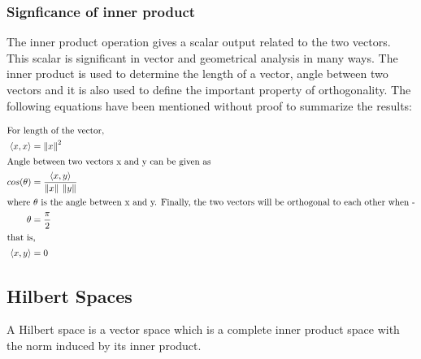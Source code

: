 \documentclass[a4paper,12pt]{article}
\newcommand\norm[1]{\left\lVert#1\right\rVert}
\begin{document}
		\subsubsection{Signficance of inner product}
			The inner product operation gives a scalar output related to the two vectors. This scalar is significant in vector and geometrical analysis in many ways. The inner product is used to determine the length of a vector, angle between two vectors and it is also used to define the important property of orthogonality. The following equations have been mentioned without proof to summarize the results:
			
			\begin{align*}
				\intertext{For length of the vector,}
				\left\langle x, x \right\rangle &= \norm{x}^{2} \\
				\intertext{Angle between two vectors x and y can be given as}
				cos(\theta)&= \frac{\left\langle x, y \right\rangle}{\norm{x} \: \norm{y}} \\
				\intertext{where $\theta$ is the angle between x and y. Finally, the two vectors will be orthogonal to each other when -}
				\theta &= \frac{\pi}{2} \\
				\intertext{that is, }
				\left\langle x, y \right\rangle &= 0 
			\end{align*}
			
	\subsection{Hilbert Spaces}
	A Hilbert space is a vector space which is a complete inner product space with the norm induced by its inner product.
\end{document}

